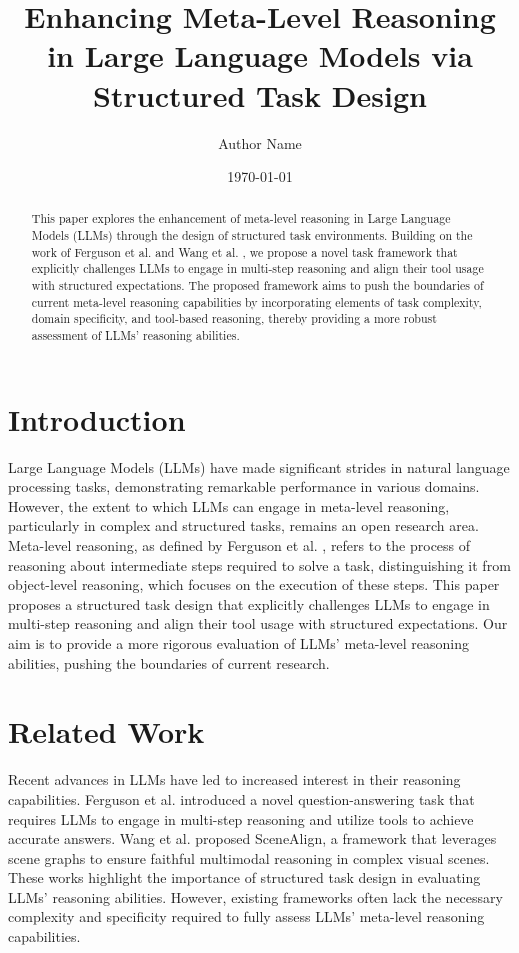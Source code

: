\documentclass[12pt]{article}
\title{Enhancing Meta-Level Reasoning in Large Language Models via Structured Task Design}
\author{Author Name}
\date{\today}
\begin{document}
\maketitle

\begin{abstract}
This paper explores the enhancement of meta-level reasoning in Large Language Models (LLMs) through the design of structured task environments. Building on the work of Ferguson et al. \cite{ferguson2026exploringmetalevelreasoninglarge} and Wang et al. \cite{wang2026scenealignaligningmultimodalreasoning}, we propose a novel task framework that explicitly challenges LLMs to engage in multi-step reasoning and align their tool usage with structured expectations. The proposed framework aims to push the boundaries of current meta-level reasoning capabilities by incorporating elements of task complexity, domain specificity, and tool-based reasoning, thereby providing a more robust assessment of LLMs' reasoning abilities.
\end{abstract}

\section{Introduction}
Large Language Models (LLMs) have made significant strides in natural language processing tasks, demonstrating remarkable performance in various domains. However, the extent to which LLMs can engage in meta-level reasoning, particularly in complex and structured tasks, remains an open research area. Meta-level reasoning, as defined by Ferguson et al. \cite{ferguson2026exploringmetalevelreasoninglarge}, refers to the process of reasoning about intermediate steps required to solve a task, distinguishing it from object-level reasoning, which focuses on the execution of these steps. This paper proposes a structured task design that explicitly challenges LLMs to engage in multi-step reasoning and align their tool usage with structured expectations. Our aim is to provide a more rigorous evaluation of LLMs' meta-level reasoning abilities, pushing the boundaries of current research.

\section{Related Work}
Recent advances in LLMs have led to increased interest in their reasoning capabilities. Ferguson et al. \cite{ferguson2026exploringmetalevelreasoninglarge} introduced a novel question-answering task that requires LLMs to engage in multi-step reasoning and utilize tools to achieve accurate answers. Wang et al. \cite{wang2026scenealignaligningmultimodalreasoning} proposed SceneAlign, a framework that leverages scene graphs to ensure faithful multimodal reasoning in complex visual scenes. These works highlight the importance of structured task design in evaluating LLMs' reasoning abilities. However, existing frameworks often lack the necessary complexity and specificity required to fully assess LLMs' meta-level reasoning capabilities.
\end{document}
